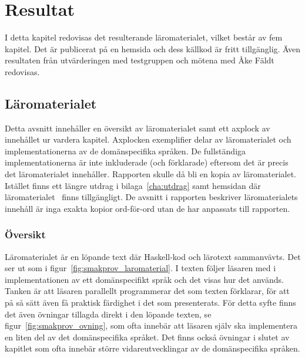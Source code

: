 \chapter{Resultat}

I detta kapitel redovisas det resulterande läromaterialet, vilket består av fem
kapitel. Det är publicerat på en hemsida och dess källkod är fritt tillgänglig.
Även resultaten från utvärderingen med testgruppen och mötena med Åke Fäldt
redovisas.

\section{Läromaterialet}\label{sec:res_laromaterial}

Detta avsnitt innehåller en översikt av läromaterialet samt ett axplock av innehållet ur
vardera kapitel. Axplocken exemplifier delar av läromaterialet och
implementationerna av de domänspecifika språken. De fullständiga implementationerna
är inte inkluderade (och förklarade) eftersom det är precis det läromaterialet
innehåller. Rapporten skulle då bli en kopia av läromaterialet. Istället
finns ett längre utdrag i bilaga~\ref{cha:utdrag} samt hemsidan där
läromaterialet~\cite{LYAP} finns tillgängligt. De avsnitt i rapporten beskriver läromaterialets innehåll är inga
exakta kopior ord-för-ord utan de har anpassats till
rapporten.

\subsection{Översikt}

Läromaterialet är en löpande text där Haskell-kod och lärotext sammanvävts. Det
ser ut som i figur~\ref{fig:smakprov_laromaterial}. I texten följer läsaren med
i implementationen av ett domänspecifikt språk och det visas hur det används.
Tanken är att läsaren parallellt programmerar det som texten förklarar, för att
på så sätt även få praktisk färdighet i det som presenterats. För detta syfte
finns det även övningar tillagda direkt i den löpande texten, se
figur~\ref{fig:smakprov_ovning}, som ofta innebär att läsaren själv ska
implementera en liten del av det domänspecifika språket. Det finns också
övningar i slutet av kapitlet som ofta innebär större vidareutvecklingar av de
domänspecifika språken.

